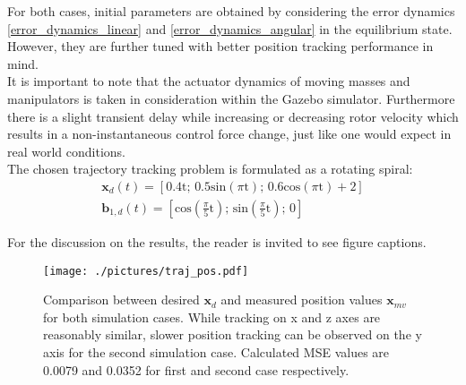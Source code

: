 For both cases, initial parameters are obtained by considering the error dynamics \eqref{error_dynamics_linear} and \eqref{error_dynamics_angular} in the equilibrium state. However, they are further tuned with better position tracking performance in mind.\\
It is important to note that the actuator dynamics of moving masses and manipulators is taken in consideration within the Gazebo simulator. Furthermore there is a slight transient delay while increasing or decreasing rotor velocity which results in a non-instantaneous control force change, just like one would expect in real world conditions. \\
\indent The chosen trajectory tracking problem is formulated as a rotating spiral:
\begin{gather*}
	\textbf{x}_d(t) = [0.4\text{t}; \, 0.5\text{sin}(\pi\text{t}); \, 0.6\text{cos}(\pi\text{t}) + 2] \\
	\textbf{b}_{1,d}(t) = [\text{cos}\left(\frac{\pi}{5}\text{t}\right); \, \text{sin}\left(\frac{\pi}{5}\text{t}\right); \, 0]
\end{gather*}

For the discussion on the results, the reader is invited to see figure captions. 

\begin{figure}
	\centering
	\texttt{[image: ./pictures/traj\_pos.pdf]}
	\caption{Comparison between desired $\textbf{x}_d$ and measured position values $\textbf{x}_{mv}$ for both simulation cases. While tracking on x and z axes are reasonably similar, slower position tracking can be observed on the y axis for the second simulation case. Calculated MSE values are 0.0079 and 0.0352 for first and second case respectively.}
	\label{fig:traj_pos}
\end{figure}

